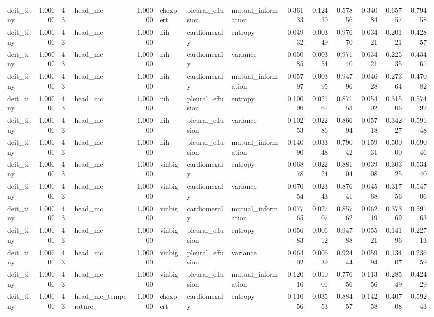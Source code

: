 \begin{tabular}{lrllrlllrrrrrr}
deit\_tiny & 1.00000 & 43 & head\_mc & 1.00000 & chexpert & pleural\_effusion & mutual\_information & 0.36133 & 0.12430 & 0.57856 & 0.34084 & 0.65757 & 0.79458 \\
deit\_tiny & 1.00000 & 43 & head\_mc & 1.00000 & nih & cardiomegaly & entropy & 0.04932 & 0.00349 & 0.97670 & 0.03421 & 0.20121 & 0.42857 \\
deit\_tiny & 1.00000 & 43 & head\_mc & 1.00000 & nih & cardiomegaly & variance & 0.05085 & 0.00354 & 0.97140 & 0.03421 & 0.22535 & 0.43461 \\
deit\_tiny & 1.00000 & 43 & head\_mc & 1.00000 & nih & cardiomegaly & mutual\_information & 0.05797 & 0.00395 & 0.94796 & 0.04628 & 0.27364 & 0.47082 \\
deit\_tiny & 1.00000 & 43 & head\_mc & 1.00000 & nih & pleural\_effusion & entropy & 0.10006 & 0.02161 & 0.87153 & 0.05402 & 0.31506 & 0.57492 \\
deit\_tiny & 1.00000 & 43 & head\_mc & 1.00000 & nih & pleural\_effusion & variance & 0.10253 & 0.02286 & 0.86694 & 0.05718 & 0.34227 & 0.59148 \\
deit\_tiny & 1.00000 & 43 & head\_mc & 1.00000 & nih & pleural\_effusion & mutual\_information & 0.14090 & 0.03348 & 0.79042 & 0.15931 & 0.50000 & 0.69046 \\
deit\_tiny & 1.00000 & 43 & head\_mc & 1.00000 & vinbig & cardiomegaly & entropy & 0.06878 & 0.02224 & 0.88104 & 0.03908 & 0.30325 & 0.53440 \\
deit\_tiny & 1.00000 & 43 & head\_mc & 1.00000 & vinbig & cardiomegaly & variance & 0.07054 & 0.02343 & 0.87641 & 0.04568 & 0.31756 & 0.54706 \\
deit\_tiny & 1.00000 & 43 & head\_mc & 1.00000 & vinbig & cardiomegaly & mutual\_information & 0.07765 & 0.02707 & 0.85762 & 0.06219 & 0.37369 & 0.59163 \\
deit\_tiny & 1.00000 & 43 & head\_mc & 1.00000 & vinbig & pleural\_effusion & entropy & 0.05683 & 0.00612 & 0.94788 & 0.05521 & 0.14196 & 0.22713 \\
deit\_tiny & 1.00000 & 43 & head\_mc & 1.00000 & vinbig & pleural\_effusion & variance & 0.06402 & 0.00639 & 0.92444 & 0.05994 & 0.13407 & 0.23659 \\
deit\_tiny & 1.00000 & 43 & head\_mc & 1.00000 & vinbig & pleural\_effusion & mutual\_information & 0.12016 & 0.01001 & 0.77656 & 0.11356 & 0.28549 & 0.42429 \\
deit\_tiny & 1.00000 & 43 & head\_mc\_temperature & 1.00000 & chexpert & cardiomegaly & entropy & 0.11056 & 0.03553 & 0.88457 & 0.14258 & 0.40708 & 0.59243 \\

\end{tabular}
